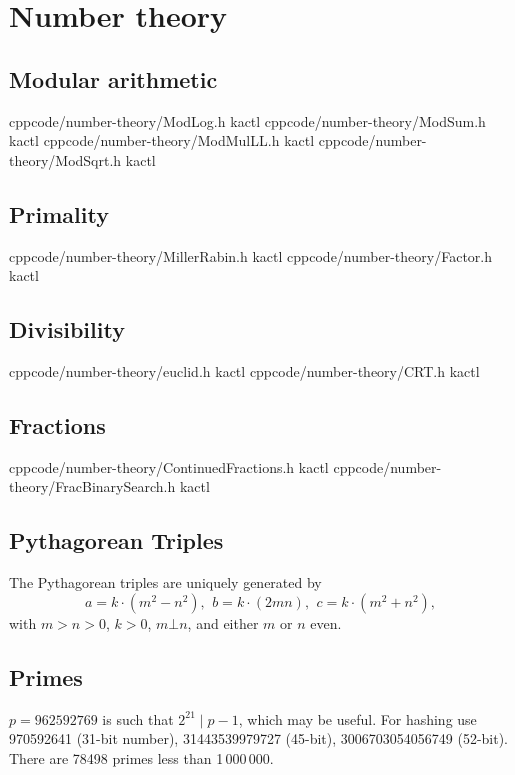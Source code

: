 \chapter{Number theory}

\section{Modular arithmetic}
    {}{}
    {cpp}{code/number-theory/ModLog.h}
    {kactl}
    {}{}
    {cpp}{code/number-theory/ModSum.h}
    {kactl}
    {}{}
    {cpp}{code/number-theory/ModMulLL.h}
    {kactl}
    {}{}
    {cpp}{code/number-theory/ModSqrt.h}
    {kactl}

\section{Primality}
    {}{}
    {cpp}{code/number-theory/MillerRabin.h}
    {kactl}
    {}{}
    {cpp}{code/number-theory/Factor.h}
    {kactl}

\section{Divisibility}
    {}{}
    {cpp}{code/number-theory/euclid.h}
    {kactl}
    {}{}
    {cpp}{code/number-theory/CRT.h}
    {kactl}

\section{Fractions}
    {}{}
    {cpp}{code/number-theory/ContinuedFractions.h}
    {kactl}
    {}{}
    {cpp}{code/number-theory/FracBinarySearch.h}
    {kactl}

\section{Pythagorean Triples}
 The Pythagorean triples are uniquely generated by
 \[ a=k\cdot (m^{2}-n^{2}),\ \,b=k\cdot (2mn),\ \,c=k\cdot (m^{2}+n^{2}), \]
 with $m > n > 0$, $k > 0$, $m \bot n$, and either $m$ or $n$ even.

\section{Primes}
	$p=962592769$ is such that $2^{21} \mid p-1$, which may be useful. For hashing
	use 970592641 (31-bit number), 31443539979727 (45-bit), 3006703054056749
	(52-bit). There are 78498 primes less than 1\,000\,000.

